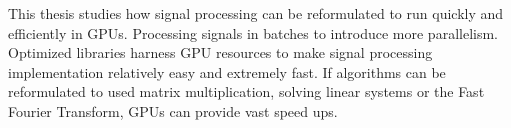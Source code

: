 This thesis studies how signal processing can be reformulated to run quickly and efficiently in GPUs.
Processing signals in batches to introduce more parallelism.
Optimized libraries harness GPU resources to make signal processing implementation relatively easy and extremely fast.
If algorithms can be reformulated to used matrix multiplication, solving linear systems or the Fast Fourier Transform, GPUs can provide vast speed ups.
